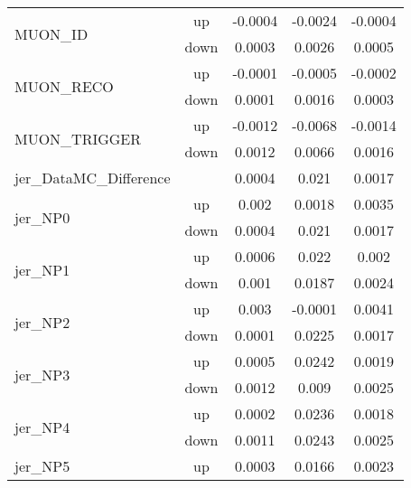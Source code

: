 \begin{table}[h!]
\begin{tabular}{lcccc}
\multirow{2}{*}{MUON\_ID}      & up   &     -0.0004     &     -0.0024     &     -0.0004      \\
                                       & down &     0.0003     &     0.0026     &     0.0005       \\ \hline
\multirow{2}{*}{MUON\_RECO}      & up   &     -0.0001     &     -0.0005     &     -0.0002      \\
                                       & down &     0.0001     &     0.0016     &     0.0003       \\ \hline
\multirow{2}{*}{MUON\_TRIGGER}      & up   &     -0.0012     &     -0.0068     &     -0.0014      \\
                                       & down &     0.0012     &     0.0066     &     0.0016       \\ \hline
\multirow{2}{*}{jer\_DataMC\_Difference}  &  & \multirow{2}{*}{0.0004} & \multirow{2}{*}{0.021}  & \multirow{2}{*}{0.0017}  \\  \\ \hline
\multirow{2}{*}{jer\_NP0}      & up   &     0.002     &     0.0018     &     0.0035      \\
                                       & down &     0.0004     &     0.021     &     0.0017       \\ \hline
\multirow{2}{*}{jer\_NP1}      & up   &     0.0006     &     0.022     &     0.002      \\
                                       & down &     0.001     &     0.0187     &     0.0024       \\ \hline
\multirow{2}{*}{jer\_NP2}      & up   &     0.003     &     -0.0001     &     0.0041      \\
                                       & down &     0.0001     &     0.0225     &     0.0017       \\ \hline
\multirow{2}{*}{jer\_NP3}      & up   &     0.0005     &     0.0242     &     0.0019      \\
                                       & down &     0.0012     &     0.009     &     0.0025       \\ \hline
\multirow{2}{*}{jer\_NP4}      & up   &     0.0002     &     0.0236     &     0.0018      \\
                                       & down &     0.0011     &     0.0243     &     0.0025       \\ \hline
\multirow{2}{*}{jer\_NP5}      & up   &     0.0003     &     0.0166     &     0.0023      \\

\end{tabular}
\end{table}
